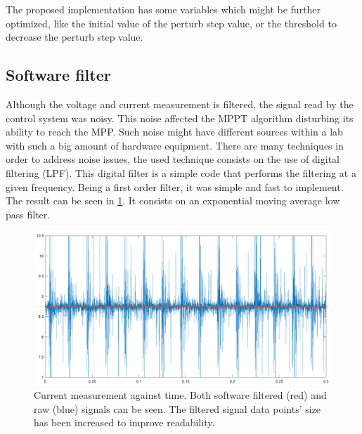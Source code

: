 The proposed implementation has some variables which might be further optimized, like the initial value of the perturb step value, or the threshold to decrease the perturb step value. 


\subsection{Software filter}
Although the voltage and current measurement is filtered, the signal read by the control system was noisy. This noise affected the MPPT algorithm disturbing its ability to reach the MPP. Such noise might have different sources within a lab with such a big amount of hardware equipment. There are many techniques in order to address noise issues, the used technique consists on the use of digital filtering (LPF). This digital filter is a  simple code that performs the filtering at a given frequency. Being a first order filter, it was simple and fast to implement. The result can be seen in \ref{software_filter}. It consists on an exponential moving average low pass filter.  

\begin{figure}[htbp]
	\begin{center}
		\includegraphics[width=\textwidth]{../Pictures/P1/Discussion/sw_filter_current.png}
		\caption{Current measurement against time. Both software filtered (red) and raw (blue) signals can be seen. The filtered signal data points' size has been increased to improve readability.}
		\label{software_filter}
	\end{center}	
\end{figure}











